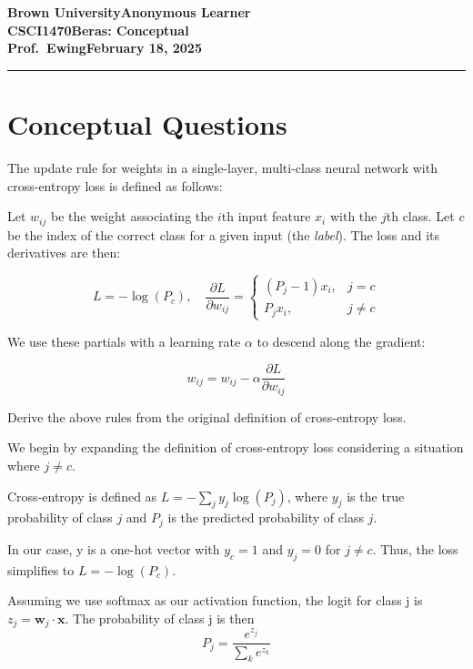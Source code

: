 \documentclass[11pt, answers]{exam}
\newcommand{\myname}{Anonymous Learner}
\newcommand{\assignment}{Beras: Conceptual}
\newcommand{\duedate}{February 18, 2025}
\begin{document}
\textbf{Brown University}\hfill\textbf{\myname}\\[0.01in]
\textbf{CSCI1470}\hfill\textbf{\assignment}\\[0.01in]
\textbf{Prof.\ Ewing}\hfill\textbf{\duedate}\\
\smallskip\hrule\bigskip

\section{Conceptual Questions}

\begin{questions}

	\question The update rule for weights in a single-layer, multi-class neural network with cross-entropy loss is defined as follows:

	Let \( w_{ij} \) be the weight associating the \( i \)th input feature \( x_i \) with the \( j \)th class. Let \( c \) be the index of the correct class for a given input (the \textit{label}). The loss and its derivatives are then:

	\[
		L = -\log(P_c), \quad \frac{\partial L}{\partial w_{ij}} =
		\begin{cases}
			(P_j - 1)x_i, & j = c    \\
			P_j x_i,      & j \neq c
		\end{cases}
	\]

	We use these partials with a learning rate \( \alpha \) to descend along the gradient:

	\[
		w_{ij} = w_{ij} - \alpha \frac{\partial L}{\partial w_{ij}}
	\]

	Derive the above rules from the original definition of cross-entropy loss.

	\begin{solution}
		We begin by expanding the definition of cross-entropy loss considering a situation where \(j \neq c\).

		Cross-entropy is defined as \( L = -\sum_{j} y_j \log(P_j) \), where \( y_j \) is the true probability of class \( j \) and \( P_j \) is the predicted probability of class \( j \).

		In our case, y is a one-hot vector with \( y_c = 1 \) and \( y_j = 0 \) for \( j \neq c \). Thus, the loss simplifies to \( L = -\log(P_c) \).

		Assuming we use softmax as our activation function, the logit for class j is \( z_j = \mathbf{w}_j \cdot \mathbf{x} \). The probability of class j is then
		\[ P_j = \frac{e^{z_j}}{\sum_{k} e^{z_k}} \]


\end{solution}
\end{questions}
\end{document}
